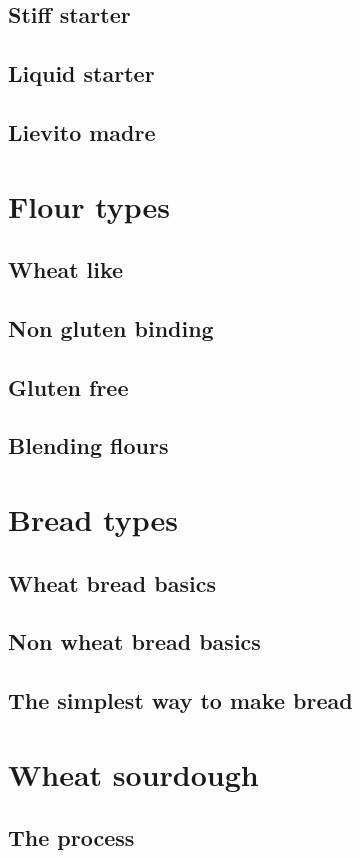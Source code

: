 \documentclass[a4paper, 12pt]{book}
\begin{document}
\section{Stiff starter}
\section{Liquid starter}
\section{Lievito madre}

\chapter{Flour types}
\section{Wheat like}
\section{Non gluten binding}
\section{Gluten free}
\section{Blending flours}

\chapter{Bread types}
\section{Wheat bread basics}
\section{Non wheat bread basics}
\section{The simplest way to make bread}

\chapter{Wheat sourdough}
\section{The process}
\end{document}
